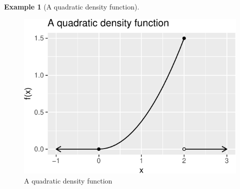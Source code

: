 \documentclass[
]{book}
\theoremstyle{definition}
\theoremstyle{definition}
\newtheorem{example}{Example}[chapter]
\theoremstyle{definition}
\theoremstyle{definition}
\theoremstyle{remark}
\begin{document}
\begin{example}[A quadratic density function]
\begin{figure}
\centering
\includegraphics{math340-notes_files/figure-latex/quadratic-density-1.pdf}
\caption{\label{fig:quadratic-density}A quadratic density function}
\end{figure}

\end{example}
\end{document}
